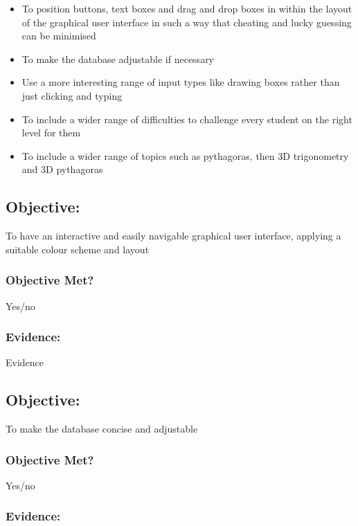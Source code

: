 \begin{itemize}
	\item To position buttons, text boxes and drag and drop boxes in within the layout of the graphical user interface in such a way that cheating and lucky guessing can be minimised
	\item To make the database adjustable if necessary
	\item Use a more interesting range of input types like drawing boxes rather than just clicking and typing
	\item To include a wider range of difficulties to challenge every student on the right level for them
	\item To include a wider range of topics such as pythagoras, then 3D trigonometry and 3D pythagoras
\end{itemize}

\subsection{Objective: }

To have an interactive and easily navigable graphical user interface, applying a suitable colour scheme and layout

\subsubsection{Objective Met?}

Yes/no 

\subsubsection{Evidence: }

Evidence

\subsection{Objective: }

To make the database concise and adjustable

\subsubsection{Objective Met?}

Yes/no 

\subsubsection{Evidence: }

